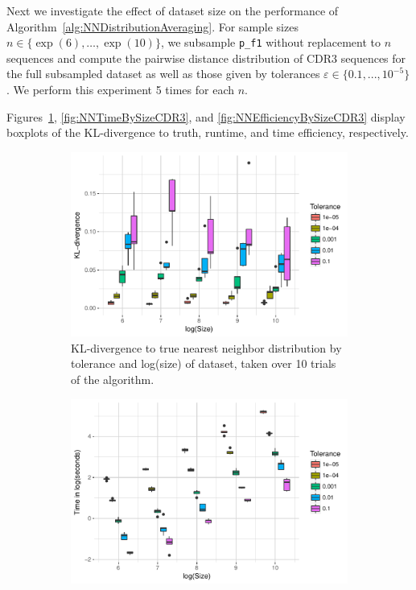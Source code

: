 \documentclass{article}
\begin{document}
Next we investigate the effect of dataset size on the performance of Algorithm~\ref{alg:NNDistributionAveraging}.
For sample sizes $n \in \{\exp(6), \dots, \exp(10)\}$, we subsample \texttt{p\_f1} without replacement to $n$ sequences and compute the pairwise distance distribution of CDR3 sequences for the full subsampled dataset as well as those given by tolerances $\varepsilon \in \{0.1, ..., 10^{-5}\}$.
We perform this experiment 5 times for each $n$.

Figures~\ref{fig:NNDivBySizeCDR3}, \ref{fig:NNTimeBySizeCDR3}, and \ref{fig:NNEfficiencyBySizeCDR3} display boxplots of the KL-divergence to truth, runtime, and time efficiency, respectively.
\begin{figure}
	\begin{subfigure}{0.49\textwidth}
    	\includegraphics[width=\linewidth]{Figures/NearestNeighbor/CDR3/div_by_size_and_tol.pdf}
    	\caption{KL-divergence to true nearest neighbor distribution by tolerance and log(size) of dataset, taken over 10 trials of the algorithm.}
    	\label{fig:NNDivBySizeCDR3}
	\end{subfigure}
	\begin{subfigure}{0.49\textwidth}
    	\includegraphics[width=\linewidth]{Figures/NearestNeighbor/CDR3/time_by_size_and_tol.pdf}

\end{subfigure}
\end{figure}
\end{document}
